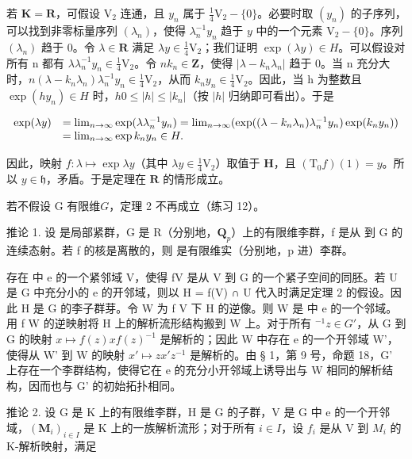 若 \(\mathbf{K} = \mathbf{R}\)，可假设 \(\mathrm{V}_2\) 连通，且 \(y_{n}\) 属于 \(\frac{1}{4}\mathrm{V}_2 - \{0\}\)。必要时取 \((y_n)\) 的子序列，可以找到非零标量序列 \((\lambda_n)\)，使得 \(\lambda_n^{-1}y_n\) 趋于 \(y\) 中的一个元素 \(\mathrm{V}_2 - \{0\}\)。序列 \((\lambda_n)\) 趋于 0。令 \(\lambda \in \mathbf{R}\) 满足 \(\lambda y \in \frac{1}{4}\mathrm{V}_2\)；我们证明 \(\exp (\lambda y) \in H\)。可以假设对所有 n 都有 \(\lambda\lambda_n^{-1}y_n \in \frac{1}{4}\mathrm{V}_2\)。令 \(n\)\(k_n \in \mathbf{Z}\)，使得 \(|\lambda - k_n\lambda_n|\) 趋于 0。当 n 充分大时，\(n\)\((\lambda - k_n\lambda_n)\lambda_n^{-1}y_n \in \frac{1}{4}\mathrm{V}_2\)，从而 \(k_n y_n \in \frac{1}{4}\mathrm{V}_2\)。因此，当 h 为整数且 \(\exp (hy_n) \in H\) 时，\(h\)\(0 \leqslant |h| \leqslant |k_n|\)（按 \(|h|\) 归纳即可看出）。于是

\[
\begin{array}{r l} \exp (\lambda y) & = \lim _ {n \to \infty} \exp (\lambda \lambda_ {n} ^ {- 1} y _ {n}) = \lim _ {n \to \infty} (\exp ((\lambda - k _ {n} \lambda_ {n}) \lambda_ {n} ^ {- 1} y _ {n}) \exp (k _ {n} y _ {n})) \\ & = \lim _ {n \to \infty} \exp k _ {n} y _ {n} \in H. \end{array}
\]

因此，映射 \(f \colon \lambda \mapsto \exp \lambda y\)（其中 \(\lambda y \in \frac{1}{4} \mathrm{V}_2\)）取值于 \(\mathbf{H}\)，且 \((\mathrm{T}_0f)(1) = y\)。所以 \(y \in \mathfrak{h}\)，矛盾。于是定理在 \(\mathbf{R}\) 的情形成立。

若不假设 G 有限维\(G\)，定理 2 不再成立（练习 12）。

 推论 1. 设  是局部紧群，G 是 R（分别地，\(\mathbf{Q}_{p}\)）上的有限维李群，f 是从  到 G 的连续态射。若 f 的核是离散的，则  是有限维实（分别地，p 进）李群。

存在  中 e 的一个紧邻域 V，使得 f\textbar V 是从 V 到 G 的一个紧子空间的同胚。若 U 是 G 中充分小的 e 的开邻域，则以 H = f(V) ∩ U 代入时满足定理 2 的假设。因此 H 是 G 的李子群芽。令 W 为 f\textbar{} V 下 H 的逆像。则 W 是  中 e 的一个邻域。用 f\textbar{} W 的逆映射将 H 上的解析流形结构搬到 W 上。对于所有 \(^{-1}\)\(z \in G'\)，从 G 到 G 的映射 \(x \mapsto f(z)xf(z)^{-1}\) 是解析的；因此 W 中存在 e 的一个开邻域 W'，使得从 W' 到 W 的映射 \(x' \mapsto zx'z^{-1}\) 是解析的。由 § 1，第 9 号，命题 18，G' 上存在一个李群结构，使得它在 e 的充分小开邻域上诱导出与 W 相同的解析结构，因而也与 G' 的初始拓扑相同。

推论 2. 设 G 是 K 上的有限维李群，H 是 G 的子群，V 是 G 中 e 的一个开邻域，\((\mathbf{M}_{i})_{i\in I}\) 是 K 上的一族解析流形；对于所有 \(i\in I\)，设 \(f_{i}\) 是从 V 到 \(M_{i}\) 的 K-解析映射，满足


